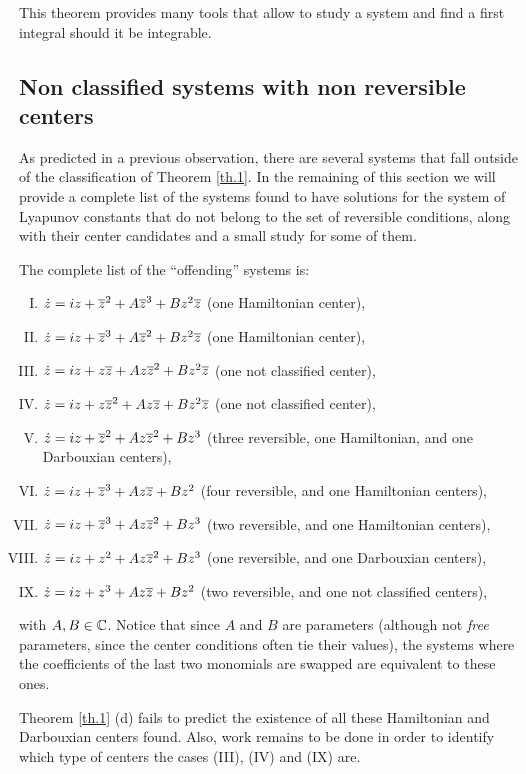 This theorem provides many tools that allow to study a system and find a first integral should it be integrable.

\subsection{Non classified systems with non reversible centers}


As predicted in a previous observation, there are several systems that fall outside of the classification of Theorem \ref{th.1}. In the remaining of this section we will provide a complete list of the systems found to have solutions for the system of Lyapunov constants that do not belong to the set of reversible conditions, along with their center candidates and a small study for some of them.

The complete list of the ``offending'' systems is:
\begin{enumerate}[(I)]
\item
$\dot z = iz+\overline{z}^2+A\overline{z}^3+Bz^2\overline{z}$ (one Hamiltonian center),%
\item
$\dot z = iz+\overline{z}^3+A\overline{z}^2+Bz^2\overline{z}$ (one Hamiltonian center),%
\item
$\dot z = iz+z\overline{z}+Az\overline{z}^2+Bz^2\overline{z}$ (one not classified center),%
\item
$\dot z = iz+z\overline{z}^2+Az\overline{z}+Bz^2\overline{z}$ (one not classified center),%
\item
$\dot z = iz+\overline{z}^2+Az\overline{z}^2+Bz^3$ (three reversible, one Hamiltonian, and one Darbouxian centers),%
\item
$\dot z = iz+\overline{z}^3+Az\overline{z}+Bz^2$ (four reversible, and one Hamiltonian centers),%
\item
$\dot z = iz+\overline{z}^3+Az\overline{z}^2+Bz^3$ (two reversible, and one Hamiltonian centers),%
\item
$\dot z = iz+z^2+Az\overline{z}^2+Bz^3$ (one reversible, and one Darbouxian centers),%
\item
$\dot z = iz+z^3+Az\overline{z}+Bz^2$ (two reversible, and one not classified centers),%
\end{enumerate}
with $A,B\in\mathbb{C}$. Notice that since $A$ and $B$ are parameters (although not \emph{free} parameters, since the center conditions often tie their values), the systems where the coefficients of the last two monomials are swapped are equivalent to these ones.

\begin{observacio}
Theorem \ref{th.1} (d) fails to predict the existence of all these Hamiltonian and Darbouxian centers found. Also, work remains to be done in order to identify which type of centers the cases (III), (IV) and (IX) are.
\end{observacio}

